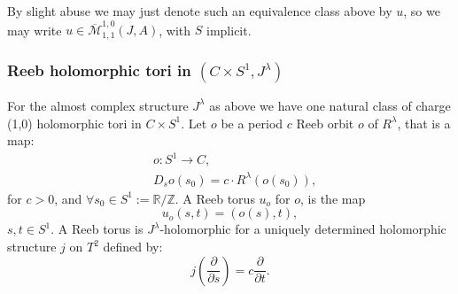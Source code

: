 \documentclass{amsart}
\numberwithin{equation}{section}
\theoremstyle{definition}
\theoremstyle{remark}
\begin{document}
By slight abuse we may just denote such an equivalence class above by $u$, so we may write $u \in \overline{\mathcal{M}} ^{1,0} _{1,1}  (J, A ) $, with $S$ implicit.
\subsubsection {Reeb holomorphic tori in $(C \times S ^{1}, J ^{\lambda})  $}
For the almost complex structure $J ^{\lambda} $ as above we have
one natural class of charge (1,0) holomorphic tori in $C \times S ^{1} $.
Let $o$ be a period $c$ Reeb orbit $o$ of $R ^{\lambda} $, that is a map:
\begin{align*}
   & o: S ^{1}  \to C,  \\
   & D _{s}  o (s _{0}) = c \cdot R ^{\lambda} (o (s _{0})),
\end{align*}
for $c>0$, and $\forall s _{0} \in S ^{1}:=\mathbb{R}/\mathbb{Z} $.
A Reeb torus $u _{o} $ for $o$, is the 
map $$u_o (s, t)= (o  (s), t),$$ $s,
t \in S ^{1}$.
A Reeb torus is $J ^{\lambda} $-holomorphic for a uniquely determined holomorphic structure $j$ on $T ^{2} $ defined by:
$$j
(\frac{\partial}{\partial s}) = c \frac{\partial} {\partial t}. $$
\end{document}
